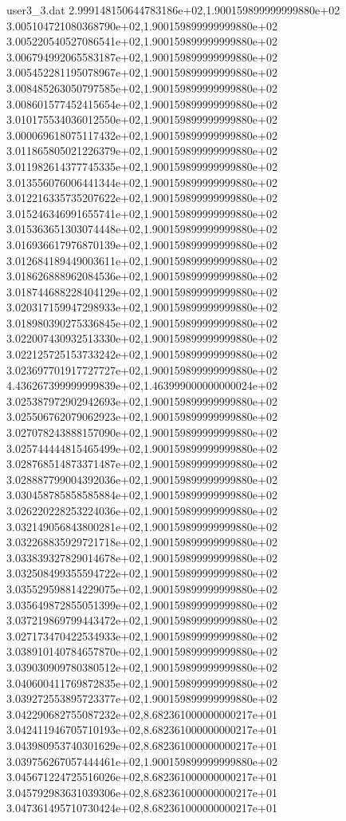 \begin{filecontents}{user3_3.dat}
2.999148150644783186e+02,1.900159899999999880e+02
3.005104721080368790e+02,1.900159899999999880e+02
3.005220540527086541e+02,1.900159899999999880e+02
3.006794992065583187e+02,1.900159899999999880e+02
3.005452281195078967e+02,1.900159899999999880e+02
3.008485263050797585e+02,1.900159899999999880e+02
3.008601577452415654e+02,1.900159899999999880e+02
3.010175534036012550e+02,1.900159899999999880e+02
3.000069618075117432e+02,1.900159899999999880e+02
3.011865805021226379e+02,1.900159899999999880e+02
3.011982614377745335e+02,1.900159899999999880e+02
3.013556076006441344e+02,1.900159899999999880e+02
3.012216335735207622e+02,1.900159899999999880e+02
3.015246346991655741e+02,1.900159899999999880e+02
3.015363651303074448e+02,1.900159899999999880e+02
3.016936617976870139e+02,1.900159899999999880e+02
3.012684189449003611e+02,1.900159899999999880e+02
3.018626888962084536e+02,1.900159899999999880e+02
3.018744688228404129e+02,1.900159899999999880e+02
3.020317159947298933e+02,1.900159899999999880e+02
3.018980390275336845e+02,1.900159899999999880e+02
3.022007430932513330e+02,1.900159899999999880e+02
3.022125725153733242e+02,1.900159899999999880e+02
3.023697701917727727e+02,1.900159899999999880e+02
4.436267399999999839e+02,1.463999000000000024e+02
3.025387972902942693e+02,1.900159899999999880e+02
3.025506762079062923e+02,1.900159899999999880e+02
3.027078243888157090e+02,1.900159899999999880e+02
3.025744444815465499e+02,1.900159899999999880e+02
3.028768514873371487e+02,1.900159899999999880e+02
3.028887799004392036e+02,1.900159899999999880e+02
3.030458785858585884e+02,1.900159899999999880e+02
3.026220228253224036e+02,1.900159899999999880e+02
3.032149056843800281e+02,1.900159899999999880e+02
3.032268835929721718e+02,1.900159899999999880e+02
3.033839327829014678e+02,1.900159899999999880e+02
3.032508499355594722e+02,1.900159899999999880e+02
3.035529598814229075e+02,1.900159899999999880e+02
3.035649872855051399e+02,1.900159899999999880e+02
3.037219869799443472e+02,1.900159899999999880e+02
3.027173470422534933e+02,1.900159899999999880e+02
3.038910140784657870e+02,1.900159899999999880e+02
3.039030909780380512e+02,1.900159899999999880e+02
3.040600411769872835e+02,1.900159899999999880e+02
3.039272553895723377e+02,1.900159899999999880e+02
3.042290682755087232e+02,8.682361000000000217e+01
3.042411946705710193e+02,8.682361000000000217e+01
3.043980953740301629e+02,8.682361000000000217e+01
3.039756267057444461e+02,1.900159899999999880e+02
3.045671224725516026e+02,8.682361000000000217e+01
3.045792983631039306e+02,8.682361000000000217e+01
3.047361495710730424e+02,8.682361000000000217e+01

\end{filecontents}
